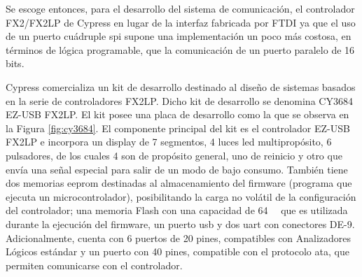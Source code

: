 Se escoge entonces, para el desarrollo del sistema de comunicación, el controlador FX2/FX2LP de Cypress en lugar de la interfaz fabricada por FTDI ya que el uso de un puerto cuádruple \acrshort{spi} supone una implementación un poco más costosa, en términos de lógica programable, que la comunicación de un puerto paralelo de 16 bits.

Cypress comercializa un kit de desarrollo destinado al diseño de sistemas basados en la serie de controladores FX2LP. Dicho kit de desarrollo se denomina CY3684 EZ-USB FX2LP. El kit posee una placa de desarrollo como la que se observa en la Figura \ref{fig:cy3684}. El componente principal del kit es el controlador EZ-USB FX2LP e incorpora un display de 7 segmentos, 4 luces led multipropósito, 6 pulsadores, de los cuales 4 son de propósito general, uno de reinicio y otro que envía una señal especial para salir de un modo de bajo consumo. También tiene dos memorias \acrshort{eeprom} destinadas al almacenamiento del firmware (programa que ejecuta un microcontrolador), posibilitando la carga no volátil de la configuración del controlador; una memoria Flash con una capacidad de \SI{64}{\kilo\byte} que es utilizada durante la ejecución del firmware, un puerto \acrshort{usb} y dos \acrshort{uart} con conectores DE-9. Adicionalmente, cuenta con 6 puertos de 20 pines, compatibles con Analizadores Lógicos estándar y un puerto con 40 pines, compatible con el protocolo \acrshort{ata}, que permiten comunicarse con el controlador.
 

